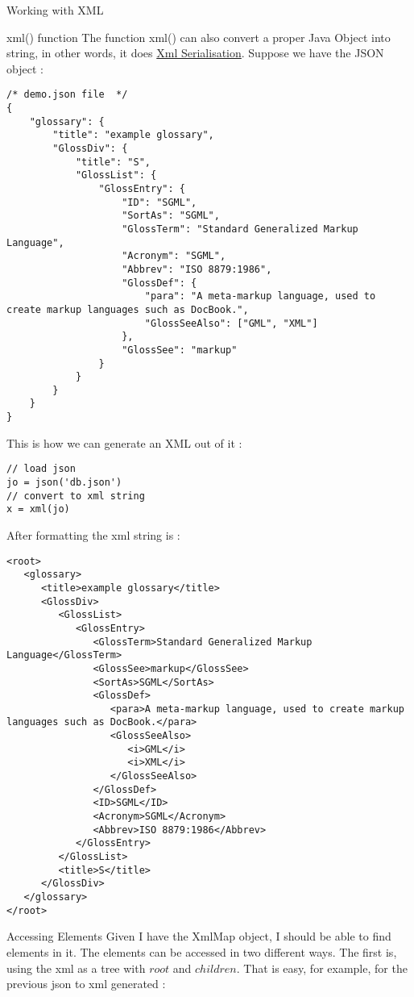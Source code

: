 \begin{section}{Working with XML}
\begin{subsection}{xml() function}
The function xml() can also convert a proper Java Object into string, 
in other words, it does \href{https://msdn.microsoft.com/en-us/library/182eeyhh(v=vs.110).aspx}{Xml Serialisation}. 
Suppose we have the JSON object : 

\begin{lstlisting}[style=JexlStyle]
/* demo.json file  */
{
    "glossary": {
        "title": "example glossary",
        "GlossDiv": {
            "title": "S",
            "GlossList": {
                "GlossEntry": {
                    "ID": "SGML",
                    "SortAs": "SGML",
                    "GlossTerm": "Standard Generalized Markup Language",
                    "Acronym": "SGML",
                    "Abbrev": "ISO 8879:1986",
                    "GlossDef": {
                        "para": "A meta-markup language, used to create markup languages such as DocBook.",
                        "GlossSeeAlso": ["GML", "XML"]
                    },
                    "GlossSee": "markup"
                }
            }
        }
    }
}
\end{lstlisting}
This is how we can generate an XML out of it :
\begin{lstlisting}[style=JexlStyle]
// load json 
jo = json('db.json')
// convert to xml string 
x = xml(jo)
\end{lstlisting}
After formatting the xml string is :
\begin{lstlisting}[style=xmlStyle]
<root>
   <glossary>
      <title>example glossary</title>
      <GlossDiv>
         <GlossList>
            <GlossEntry>
               <GlossTerm>Standard Generalized Markup Language</GlossTerm>
               <GlossSee>markup</GlossSee>
               <SortAs>SGML</SortAs>
               <GlossDef>
                  <para>A meta-markup language, used to create markup languages such as DocBook.</para>
                  <GlossSeeAlso>
                     <i>GML</i>
                     <i>XML</i>
                  </GlossSeeAlso>
               </GlossDef>
               <ID>SGML</ID>
               <Acronym>SGML</Acronym>
               <Abbrev>ISO 8879:1986</Abbrev>
            </GlossEntry>
         </GlossList>
         <title>S</title>
      </GlossDiv>
   </glossary>
</root>
\end{lstlisting}
\end{subsection}

\begin{subsection}{Accessing Elements}
Given I have the XmlMap object, I should be able to find elements in it.
The elements can be accessed in two different ways.
The first is, using the xml as a tree with $root$ and $children$.
That is easy, for example, for the previous json to xml generated :


\end{subsection}
\end{section}
